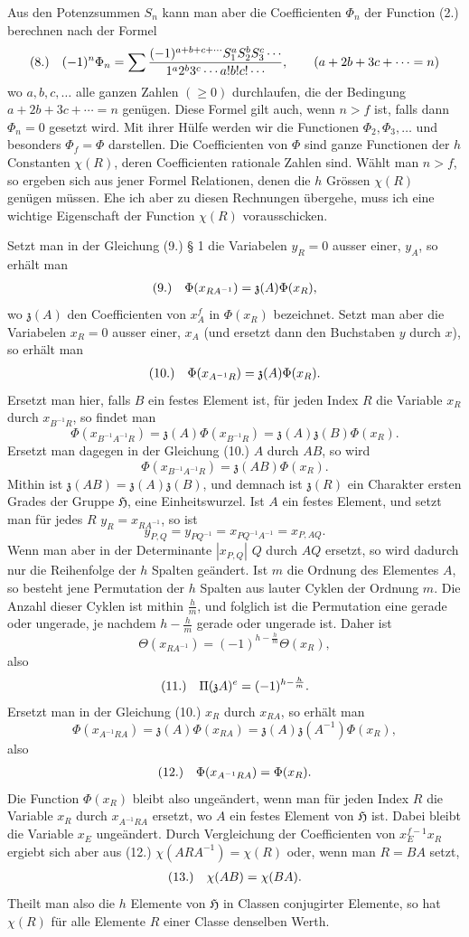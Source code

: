 \documentclass[11pt]{article}
\makeatletter
\newcommand{\Hgrp}{\mathfrak{H}}
\newcommand{\zchar}{\mathfrak{z}}
\newcommand{\frobtag}[2]{\[\begin{array}{@{}r@{\quad}l@{}}\textup{(#1)} & \displaystyle #2\end{array}\]}
\newcommand{\frobtagc}[2]{\[\begin{array}{@{}r@{\quad}c@{}}\textup{(#1)} & \displaystyle #2\end{array}\]}
\makeatother
\begin{document}
Aus den Potenzsummen $S_n$ kann man aber die Coefficienten $\Phi_n$ der Function (2.) berechnen nach der Formel
\frobtag{8.}{(-1)^n\Phi_n=\sum\frac{(-1)^{a+b+c+\cdots}S_1^aS_2^bS_3^c\cdots}{1^a2^b3^c\cdots a!b!c!\cdots},\qquad (a+2b+3c+\cdots=n)}
wo $a,b,c,\ldots$ alle ganzen Zahlen $(\ge0)$ durchlaufen, die der Bedingung $a+2b+3c+\cdots=n$ genügen. Diese Formel gilt auch, wenn $n>f$ ist, falls dann $\Phi_n=0$ gesetzt wird. Mit ihrer Hülfe werden wir die Functionen $\Phi_2,\Phi_3,\ldots$ und besonders $\Phi_f=\Phi$ darstellen. Die Coefficienten von $\Phi$ sind ganze Functionen der $h$ Constanten $\chi(R)$, deren Coefficienten rationale Zahlen sind. Wählt man $n>f$, so ergeben sich aus jener Formel Relationen, denen die $h$ Grössen $\chi(R)$ genügen müssen. Ehe ich aber zu diesen Rechnungen übergehe, muss ich eine wichtige Eigenschaft der Function $\chi(R)$ vorausschicken.

Setzt man in der Gleichung (9.) § 1 die Variabelen $y_R=0$ ausser einer, $y_A$, so erhält man
\frobtagc{9.}{\Phi(x_{RA^{-1}})=\zchar(A)\Phi(x_R),}
wo $\zchar(A)$ den Coefficienten von $x_A^f$ in $\Phi(x_R)$ bezeichnet. Setzt man aber die Variabelen $x_R=0$ ausser einer, $x_A$ (und ersetzt dann den Buchstaben $y$ durch $x$), so erhält man
\frobtagc{10.}{\Phi(x_{A^{-1}R})=\zchar(A)\Phi(x_R).}
Ersetzt man hier, falls $B$ ein festes Element ist, für jeden Index $R$ die Variable $x_R$ durch $x_{B^{-1}R}$, so findet man
\[
\Phi(x_{B^{-1}A^{-1}R})=\zchar(A)\Phi(x_{B^{-1}R})=\zchar(A)\zchar(B)\Phi(x_R).
\]
Ersetzt man dagegen in der Gleichung (10.) $A$ durch $AB$, so wird
\[
\Phi(x_{B^{-1}A^{-1}R})=\zchar(AB)\Phi(x_R).
\]
Mithin ist $\zchar(AB)=\zchar(A)\zchar(B)$, und demnach ist $\zchar(R)$ ein Charakter ersten Grades der Gruppe $\Hgrp$, eine Einheitswurzel. Ist $A$ ein festes Element, und setzt man für jedes $R$ $y_R=x_{RA^{-1}}$, so ist
\[
y_{P,Q}=y_{PQ^{-1}}=x_{PQ^{-1}A^{-1}}=x_{P,AQ}.
\]
Wenn man aber in der Determinante $|x_{P,Q}|$ $Q$ durch $AQ$ ersetzt, so wird dadurch nur die Reihenfolge der $h$ Spalten geändert. Ist $m$ die Ordnung des Elementes $A$, so besteht jene Permutation der $h$ Spalten aus lauter Cyklen der Ordnung $m$. Die Anzahl dieser Cyklen ist mithin $\frac{h}{m}$, und folglich ist die Permutation eine gerade oder ungerade, je nachdem $h-\frac{h}{m}$ gerade oder ungerade ist. Daher ist
\[
\Theta(x_{RA^{-1}})=(-1)^{h-\frac{h}{m}}\Theta(x_R),
\]
also
\frobtagc{11.}{\Pi(\zchar A)^e=(-1)^{h-\frac{h}{m}}.}
Ersetzt man in der Gleichung (10.) $x_R$ durch $x_{RA}$, so erhält man
\[
\Phi(x_{A^{-1}RA})=\zchar(A)\Phi(x_{RA})=\zchar(A)\zchar(A^{-1})\Phi(x_R),
\]
also
\frobtagc{12.}{\Phi(x_{A^{-1}RA})=\Phi(x_R).}
Die Function $\Phi(x_R)$ bleibt also ungeändert, wenn man für jeden Index $R$ die Variable $x_R$ durch $x_{A^{-1}RA}$ ersetzt, wo $A$ ein festes Element von $\Hgrp$ ist. Dabei bleibt die Variable $x_E$ ungeändert. Durch Vergleichung der Coefficienten von $x_E^{f-1}x_R$ ergiebt sich aber aus (12.) $\chi(ARA^{-1})=\chi(R)$ oder, wenn man $R=BA$ setzt,
\frobtagc{13.}{\chi(AB)=\chi(BA).}
Theilt man also die $h$ Elemente von $\Hgrp$ in Classen conjugirter Elemente, so hat $\chi(R)$ für alle Elemente $R$ einer Classe denselben Werth.
\end{document}
